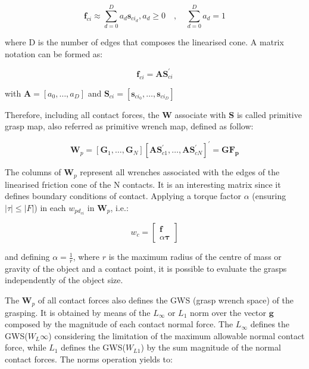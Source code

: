 \begin{equation}
	\mathbf{f}_{ci} \approx \sum_{d=0}^{D} a_{d} \mathbf{s}_{ci_d}, a_{d} \geq 0 \quad, \quad \sum_{d=0}^{D} a_{d}=1
\end{equation}

where D is the number of edges that composes the linearised cone. A matrix notation can be formed as:

\begin{equation}
	\mathbf{f}_{ci}=\mathbf{A} \mathbf{S}_{ci}^{\prime}
\end{equation}

with $\mathbf{A}=\left[a_{0}, \ldots, a_{D}\right]$ and $\mathbf{S}_{ci}=\left[\mathbf{s}_{ci_0}, \ldots, \mathbf{s}_{ci_D}\right]$

Therefore, including all contact forces, the $\mathbf{W}$ associate with $\mathbf{S}$ is called primitive grasp map, also referred as primitive wrench map, defined as follow:

\begin{equation}
	\mathbf{W}_{p}=\left[\mathbf{G}_{1}, \ldots, \mathbf{G}_{N}\right]\left[\mathbf{A} \mathbf{S}_{c 1}^{\prime}, \ldots, \mathbf{A} \mathbf{S}_{c N}^{\prime}\right]^{\prime}=\mathbf{G} \mathbf{F}_{\mathbf{p}}
\end{equation}

The columns of $\mathbf{W}_{p}$ represent all wrenches associated with the edges of the linearised friction cone of the N contacts. It is an interesting matrix since it defines boundary conditions of contact. Applying a torque factor $\alpha$ (ensuring $|\tau| \leq|F|$) in each $w_{pd_{ci}}$ in $\mathbf{W}_{p}$, i.e.:

\begin{equation}
	w_{c}=\left[\begin{array}{c}
		\boldsymbol{f} \\
		\alpha \boldsymbol{\tau}
	\end{array}\right]
\end{equation}

and defining $\alpha=\frac{1}{r}$, where $r$ is the maximum radius of the centre of mass or gravity of the object and a contact point, it is possible to evaluate the grasps independently of the object size.

The $\mathbf{W}_p$ of all contact forces also defines the GWS (grasp wrench space) of the grasping. It is obtained by means of the $L_\infty$ or $L_1$ norm over the vector $\mathbf{g}$ composed by the magnitude of each contact normal force. The $L_\infty$ defines the GWS($W_L\infty$) considering the limitation of the maximum allowable normal contact force, while $L_1$ defines the GWS($W_{L1}$) by the sum magnitude of the normal contact forces. The norms operation yields to:


